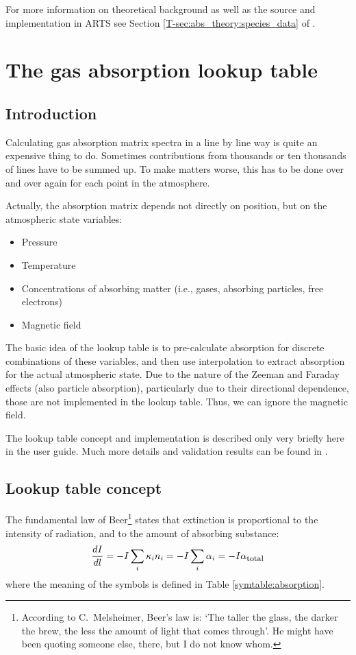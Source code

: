 For more
information on theoretical background as well as the source and implementation
in ARTS see Section \ref{T-sec:abs_theory:species_data} of \theory.


\section{The gas absorption lookup table}
\label{sec:absorption:lookup}

\subsection{Introduction}

Calculating gas absorption matrix spectra in a line by line way
is quite an expensive thing to do. Sometimes contributions from
thousands or ten thousands of lines have to be summed up. To make
matters worse, this has to be done over and over again for each point
in the atmosphere.

Actually, the absorption matrix depends not directly on position,
but on the atmospheric state variables:
\begin{itemize}
\item Pressure
\item Temperature
\item Concentrations of absorbing matter (i.e., gases, absorbing particles, free
electrons)
\item Magnetic field
\end{itemize}

The basic idea of the lookup table is to pre-calculate absorption for
discrete combinations of these variables, and then use interpolation
to extract absorption for the actual atmospheric state. Due to the nature of
the Zeeman and Faraday effects (also particle absorption), particularly due to
their directional dependence, those are not implemented in the lookup table.
Thus, we can ignore the magnetic field.

The lookup table concept and implementation is described only very
briefly here in the user guide. Much more details and validation
results can be found in \citet{buehler:absor:11}.

\subsection{Lookup table concept}

The fundamental law of Beer\footnote{According to C.\ Melsheimer,
  Beer's law is: `The taller the glass, the darker the brew, the less
  the amount of light that comes through'. He might have been quoting
  someone else, there, but I do not know whom.} states that extinction
is proportional to the intensity of radiation, and to the amount of
absorbing substance:
\begin{equation}
  \label{eq:lookup:beer}
  \frac{d I}{d l}
  =
  - I \sum_i {\kappa}_{i} {n}_{i}
  =
  - I \sum_i {\alpha}_{i}
  =
  - I {\alpha}_{\mbox{\footnotesize total}}
\end{equation}
where the meaning of the symbols is defined in Table
\ref{symtable:absorption}. 

